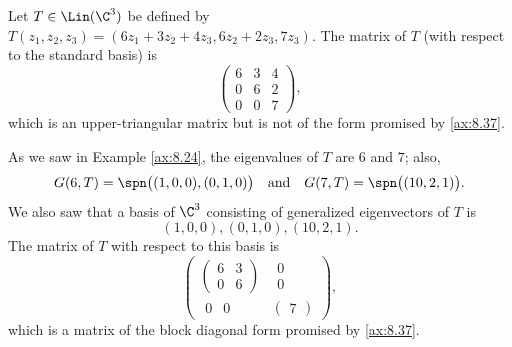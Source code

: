 \begin{example}\label{ax:8.38}
Let $T\in\Lin(\C^3)$ be defined by
$T(z_1,z_2,z_3)=(6z_1+3z_2+4z_3,6z_2+2z_3,7z_3)$. The matrix of $T$ (with
respect to the standard basis) is
\[ \begin{pmatrix} 6 & 3 & 4\\ 0 & 6 & 2\\ 0 & 0 & 7 \end{pmatrix}, \]
which is an upper-triangular matrix but is not of the form promised by
\ref{ax:8.37}.

As we saw in Example \ref{ax:8.24}, the eigenvalues of $T$ are $6$ and $7$;
also,
\[ G(6,T) = \spn\bigl((1,0,0),(0,1,0)\bigr) \quad\text{and}\quad
   G(7,T) = \spn\bigl((10,2,1)\bigr). \]
We also saw that a basis of $\C^3$ consisting of generalized eigenvectors of
$T$ is
\[ (1,0,0),(0,1,0),(10,2,1). \]
The matrix of $T$ with respect to this basis is
\[ \begin{pmatrix}
  \begin{pmatrix} 6 & 3\\ 0 & 6 \end{pmatrix} & \begin{matrix} 0\\ 0 \end{matrix}\\
  \begin{matrix} 0 & 0 \end{matrix} & \begin{pmatrix} 7 \end{pmatrix}
\end{pmatrix}, \]
which is a matrix of the block diagonal form promised by \ref{ax:8.37}.
\end{example}


